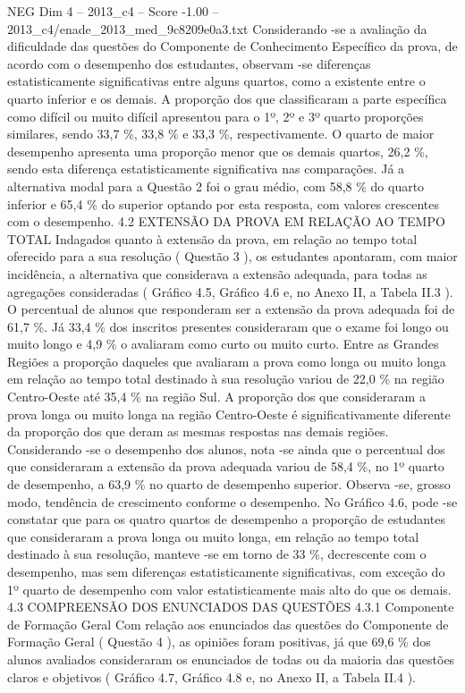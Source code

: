 \begin{textsample}{NEG Dim 4 – 2013\_c4 – Score -1.00 – 2013\_c4/enade\_2013\_med\_9c8209e0a3.txt}
Considerando -se a avaliação da dificuldade das questões do Componente de Conhecimento Específico da prova, de acordo com o desempenho dos estudantes, observam -se diferenças estatisticamente significativas entre alguns quartos, como a existente entre o quarto inferior e os demais.
A proporção dos que classificaram a parte específica como difícil ou muito difícil apresentou para o 1º, 2º e 3º quarto proporções similares, sendo 33,7 \%, 33,8 \% e 33,3 \%, respectivamente.
O quarto de maior desempenho apresenta uma proporção menor que os demais quartos, 26,2 \%, sendo esta diferença estatisticamente significativa nas comparações.
Já a alternativa modal para a Questão 2 foi o grau médio, com 58,8 \% do quarto inferior e 65,4 \% do superior optando por esta resposta, com valores crescentes com o desempenho. 4.2 EXTENSÃO DA PROVA EM RELAÇÃO AO TEMPO TOTAL Indagados quanto à extensão da prova, em relação ao tempo total oferecido para a sua resolução ( Questão 3 ), os estudantes apontaram, com maior incidência, a alternativa que considerava a extensão adequada, para todas as agregações consideradas ( Gráfico 4.5, Gráfico 4.6 e, no Anexo II, a Tabela II.3 ).
O percentual de alunos que responderam ser a extensão da prova adequada foi de 61,7 \%.
Já 33,4 \% dos inscritos presentes consideraram que o exame foi longo ou muito longo e 4,9 \% o avaliaram como curto ou muito curto.
Entre as Grandes Regiões a proporção daqueles que avaliaram a prova como longa ou muito longa em relação ao tempo total destinado à sua resolução variou de 22,0 \% na região Centro-Oeste até 35,4 \% na região Sul.
A proporção dos que consideraram a prova longa ou muito longa na região Centro-Oeste é significativamente diferente da proporção dos que deram as mesmas respostas nas demais regiões.
Considerando -se o desempenho dos alunos, nota -se ainda que o percentual dos que consideraram a extensão da prova adequada variou de 58,4 \%, no 1º quarto de desempenho, a 63,9 \% no quarto de desempenho superior.
Observa -se, grosso modo, tendência de crescimento conforme o desempenho.
No Gráfico 4.6, pode -se constatar que para os quatro quartos de desempenho a proporção de estudantes que consideraram a prova longa ou muito longa, em relação ao tempo total destinado à sua resolução, manteve -se em torno de 33 \%, decrescente com o desempenho, mas sem diferenças estatisticamente significativas, com exceção do 1º quarto de desempenho com valor estatisticamente mais alto do que os demais. 4.3 COMPREENSÃO DOS ENUNCIADOS DAS QUESTÕES 4.3.1 Componente de Formação Geral Com relação aos enunciados das questões do Componente de Formação Geral ( Questão 4 ), as opiniões foram positivas, já que 69,6 \% dos alunos avaliados consideraram os enunciados de todas ou da maioria das questões claros e objetivos ( Gráfico 4.7, Gráfico 4.8 e, no Anexo II, a Tabela II.4 ).

\end{textsample}
